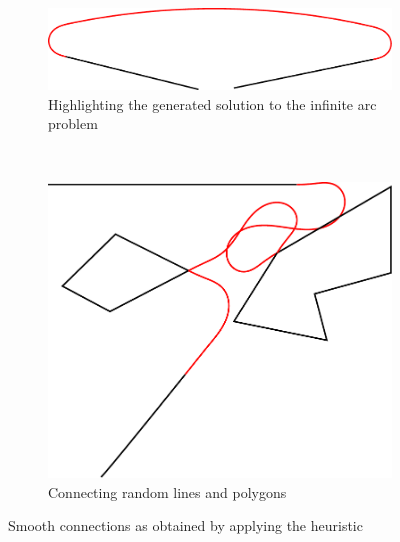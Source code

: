 \begin{figure}
\begin{subfigure}[b]{0.45\textwidth}
\includegraphics[width=\textwidth]{images/smooth/smooth_connections_2.pdf}
\caption{Highlighting the generated solution to the infinite arc problem}
\end{subfigure}
~
\begin{subfigure}[b]{0.45\textwidth}
\includegraphics[width=\textwidth]{images/smooth/smooth_connections_3.pdf}
\caption{Connecting random lines and polygons}
\end{subfigure}

\caption{Smooth connections as obtained by applying the heuristic}
\end{figure}
